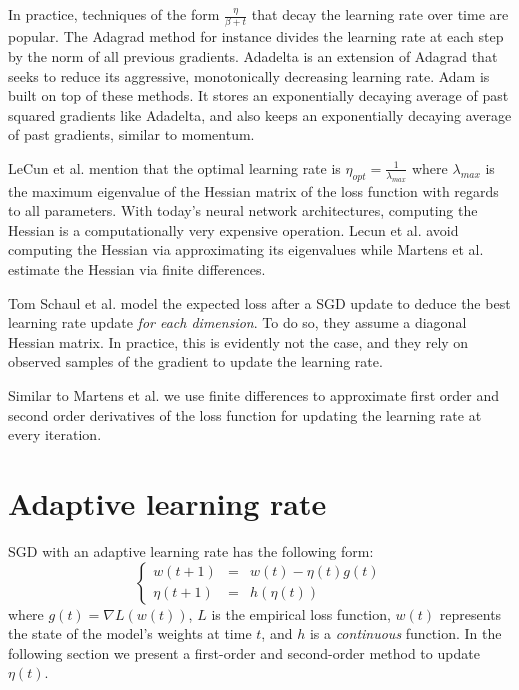 \documentclass{article}
\begin{document}
  In practice, techniques of the form $\frac{\eta}{\beta+t}$ that decay the learning rate over time are popular. The Adagrad method \cite{duchi2011adaptive} for instance divides the learning rate at each step by the norm of all previous gradients. Adadelta \cite{zeiler2012adadelta} is an extension of Adagrad that seeks to reduce its aggressive, monotonically decreasing learning rate. Adam \cite{kingma2014adam} is built on top of these methods. It stores an exponentially decaying average of past squared gradients like Adadelta, and also keeps an exponentially decaying average of past gradients, similar to momentum.
  
  LeCun et al. \cite{lecun1998gradient} mention that the optimal learning rate is $\eta_{opt} = \frac{1}{\lambda_{max}}$ where $\lambda_{max}$ is the maximum eigenvalue of the Hessian matrix of the loss function with regards to all parameters. With today's neural network architectures, computing the Hessian is a computationally very expensive operation. Lecun et al. avoid computing the Hessian via approximating its eigenvalues while Martens et al. \cite{martens2010deep} estimate the Hessian via finite differences.
  
  Tom Schaul et al. \cite{schaul2013no} model the expected loss after a SGD update to deduce the best learning rate update \emph{for each dimension}. To do so, they assume a diagonal Hessian matrix. In practice, this is evidently not the case, and they rely on observed samples of the gradient to update the learning rate.
  
  Similar to Martens et al. \cite{martens2010deep} we use finite differences to approximate first order and second order derivatives of the loss function for updating the learning rate at every iteration.
  
  
  
  \section{Adaptive learning rate}
  
  SGD with an adaptive learning rate has the following form:\\
  $$
  \left\{
  \begin{array}{lll}
  w(t+1) & = & w(t) -\eta(t)g(t)\\
  \eta(t+1) & = & h(\eta(t))
  \end{array}
  \right.
  $$
  where $g(t) = \nabla L(w(t))$, $L$ is the empirical loss function, $w(t)$ represents the state of the model's weights at time $t$, and $h$ is a \emph{continuous} function. In the following section we present a first-order and second-order method to update $\eta(t)$.
  
\end{document}
